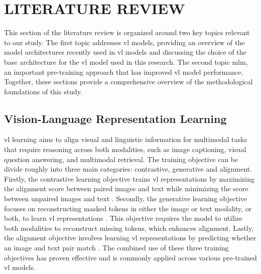 \chapter{LITERATURE REVIEW}
This section of the literature review is organized around two key topics relevant to our study.
The first topic addresses \acrshort{vl} models, providing an overview of the model architectures recently used in \acrshort{vl} models and discussing the choice of the base architecture for the \acrshort{vl} model used in this research.
The second topic \acrshort{mlm}, an important pre-training approach that has improved \acrshort{vl} model performance.
Together, these sections provide a comprehensive overview of the methodological foundations of this study.

\section{Vision-Language Representation Learning}
\Acrshort{vl} learning aims to align visual and linguistic information for multimodal tasks that require reasoning across both modalities, such as image captioning, visual question answering, and multimodal retrieval. 
The training objective can be divide roughly into three main categories: contrastive, generative and alignment.
Firstly, the contrastive learning objective trains \acrshort{vl} representations by maximizing the alignment score between paired images and text while minimizing the score between unpaired images and text \cite{clip, align, unicl}. 
Secondly, the generative learning objective focuses on reconstructing masked tokens in either the image or text modality, or both, to learn \acrshort{vl} representations \cite{flava, albef, flamingo}. 
This objective requires the model to utilize both modalities to reconstruct missing tokens, which enhances alignment. 
Lastly, the alignment objective involves learning \acrshort{vl} representations by predicting whether an image and text pair match \cite{vlmo}. 
The combined use of these three training objectives has proven effective and is commonly applied across various pre-trained \acrshort{vl} models.

